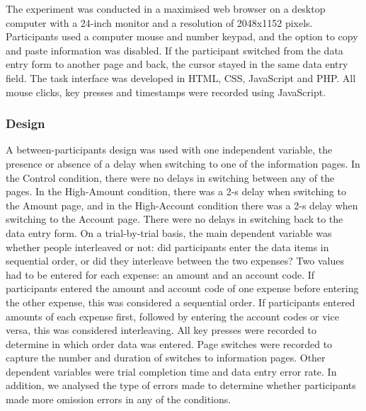 The experiment was conducted in a maximised web browser on a desktop computer with a 24-inch monitor and a resolution of 2048x1152 pixels. Participants used a computer mouse and number keypad, and the option to copy and paste information was disabled. If the participant switched from the data entry form to another page and back, the cursor stayed in the same data entry field. The task interface was developed in HTML, CSS, JavaScript and PHP. All mouse clicks, key presses and timestamps were recorded using JavaScript.

\subsubsection{Design}
A between-participants design was used with one independent variable, the presence or absence of a delay when switching to one of the information pages. In the Control condition, there were no delays in switching between any of the pages. In the High-Amount condition, there was a 2-s delay when switching to the Amount page, and in the High-Account condition there was a 2-s delay when switching to the Account page. There were no delays in switching back to the data entry form. On a trial-by-trial basis, the main dependent variable was whether people interleaved or not: did participants enter the data items in sequential order, or did they interleave between the two expenses? Two values had to be entered for each expense: an amount and an account code. If participants entered the amount and account code of one expense before entering the other expense, this was considered a sequential order. If participants entered amounts of each expense first, followed by entering the account codes or vice versa, this was considered interleaving. All key presses were recorded to determine in which order data was entered. Page switches were recorded to capture the number and duration of switches to information pages. Other dependent variables were trial completion time and data entry error rate. In addition, we analysed the type of errors made to determine whether participants made more omission errors in any of the conditions. 


